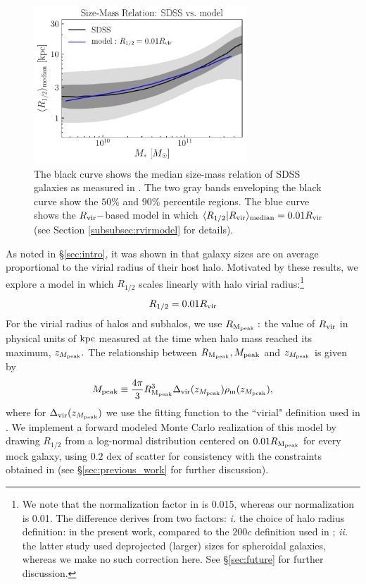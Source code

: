 \documentclass[usenatbib,usegraphicx,letterpaper]{mn2e}
\newcommand{\beq}{\begin{equation}}
\newcommand{\eeq}{\end{equation}}
\newcommand{\rhalf}{R_{1/2}}
\newcommand{\mpeak}{M_{\rm peak}}
\newcommand{\zpeak}{z_{M_{\rm peak}}}
\newcommand{\rvir}{R_{\rm vir}}
\newcommand{\rmpeak}{R_{\rm M_{peak}}}
\newcommand{\median}[2]{\langle{#1}\vert{#2}\rangle_{\rm median}}
\newcommand{\kpc}{{\rm kpc}}
\begin{document}
\begin{figure}
\centering
\includegraphics[width=8cm]{FIGS/rvir_only_rhalf_vs_mstar_sham_model.pdf}
\caption{
The black curve shows the median size-mass relation of SDSS galaxies as measured in \citet{meert_etal15}. The two gray bands enveloping the black curve show the $50\%$ and $90\%$ percentile regions. The blue curve shows the $\rvir-$based model in which $\median{\rhalf}{\rvir}=0.01\rvir$ (see Section \ref{subsubsec:rvirmodel} for details).  
}
\label{fig:scatter_plot}
\end{figure}

As noted in \S\ref{sec:intro}, it was shown in \citet{kravtsov13} that galaxy sizes are on average proportional to the virial radius of their host halo. Motivated by these results, we  explore a model in which $\rhalf$ scales linearly with halo virial radius:\footnote{We note that the normalization factor in \citet{kravtsov13} is 0.015, whereas our normalization is 0.01. The difference derives from two factors: {\em i.} the choice of halo radius definition: \citet{bryan_norman98} in the present work, compared to the $200c$ definition used in \citet{kravtsov13}; {\em ii.} the latter study used deprojected (larger) sizes for spheroidal galaxies, whereas we make no such correction here. See \S\ref{sec:future} for further discussion.}
\beq
\label{eq:fiducial_model}
\rhalf = 0.01\rvir
\eeq
For the virial radius of halos and subhalos, we use $\rmpeak:$ the value of $\rvir$ in physical units of $\kpc$ measured at the time when halo mass reached its maximum, $\zpeak.$  The relationship between $\rmpeak, \mpeak$ and $\zpeak$ is given by
\beq
\mpeak\equiv\frac{4\pi}{3}\rmpeak^{3}\Delta_{\rm vir}(\zpeak)\rho_{\rm m}(\zpeak),
\eeq
where for $\Delta_{\rm vir}(\zpeak)$ we use the fitting function to the ``virial" definition used in \citet{bryan_norman98}. We implement a forward modeled Monte Carlo realization of this model by drawing $\rhalf$ from a log-normal distribution centered on $0.01\rmpeak$ for every mock galaxy, using $0.2$ dex of scatter for consistency with the constraints obtained in \citet{somerville_etal17} (see \S\ref{sec:previous_work} for further discussion).
\end{document}
